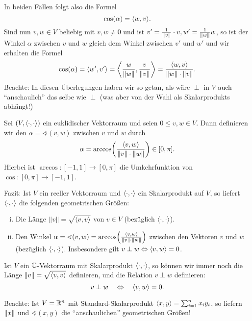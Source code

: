 \begin{bemerkung}
\begin{minipage}{.2\textwidth}
	\end{minipage}
		
		In beiden Fällen folgt also die Formel
		\[
			\cos(\alpha) = \sk{w,v}.
		\]
		Sind nun $v,w \in V$ beliebig mit $v,w \neq 0$ und ist $v' = \frac{1}{\left\lVert v\right\rVert} \cdot v, w' = \frac{1}{\left\lVert w\right\rVert} w$, so ist der Winkel $\alpha$ zwischen $v$ und $w$ gleich dem Winkel zwischen $v'$ und $w'$ und wir erhalten die Formel
		\[
			\cos(\alpha) = \left\langle w',v'\right\rangle = \left\langle\frac{w}{\left\lVert w\right\rVert},\frac{v}{\left\lVert v\right\rVert}\right\rangle = \frac{\left\langle w,v\right\rangle}{\left\lVert w\right\rVert \cdot \left\lVert v\right\rVert}.
		\]
		Beachte: In diesen Überlegungen haben wir so getan, als wäre $\perp$ in $V$ auch \enquote{anschaulich} das selbe wie $\perp$ (was aber von der Wahl als Skalarprodukts abhängt!)

\end{bemerkung}

\begin{definition}[Winkel]
	\label{def:3.15}
	Sei $(V,\left\langle\cdot,\cdot\right\rangle)$ ein euklidischer Vektorraum und seien $0 \leq v,w \in V$.
	Dann definieren wir den  $\alpha = \sphericalangle(v,w)$ zwischen $v$ und $w$ durch
	\[
		\alpha = \arccos \enb{\frac{\sk{v,w}}{\no{v} \cdot \no{w}}} \in [0,\pi].
	\]
	Hierbei ist $\arccos\colon [-1,1] \rightarrow [0,\pi]$ die Umkehrfunktion von $\cos \colon [0,\pi] \rightarrow [-1,1]$.
\end{definition}

Fazit: Ist $V$ ein reeller Vektorraum und $\left\langle\cdot,\cdot\right\rangle$ ein Skalarprodukt auf $V$, so liefert $\left\langle\cdot,\cdot\right\rangle$ die folgenden geometrischen Größen:
\begin{enumerate}[(i)]
	\item Die Länge $\left\lVert v\right\rVert = \sqrt{\left\langle v,v\right\rangle}$ von $v \in V$ (bezüglich $\left\langle\cdot,\cdot\right\rangle$).
	\item Den Winkel $\alpha = \sphericalangle(v,w) = \arccos \enb{\frac{\sk{v,w}}{\no{v} \cdot \no{w}}}$ zwischen den Vektoren $v$ und $w$ (bezüglich $\left\langle\cdot,\cdot\right\rangle$).
	Insbesondere gilt $v \perp w \Leftrightarrow \left\langle v,w\right\rangle = 0$.
\end{enumerate}
Ist $V$ ein $\mathbb{C}$-Vektorraum mit Skalarprodukt $\left\langle\cdot,\cdot\right\rangle$, so können wir immer noch die Länge $\left\lVert v\right\rVert = \sqrt{\left\langle v,v\right\rangle}$ definieren, und die Relation $v \perp w$ definieren:
\[
	v \perp w \quad \Leftrightarrow \quad \left\langle v,w\right\rangle = 0.
\]

Beachte: Ist $V = \mathbb{R}^n$ mit Standard-Skalarprodukt $\left\langle x,y\right\rangle = \sum_{i=1}^{n} x_i y_i$, so liefern $\left\lVert x\right\rVert$ und $\sphericalangle(x,y)$ die \enquote{anschaulichen} geometrischen Größen!
\cleardoubleoddemptypage
